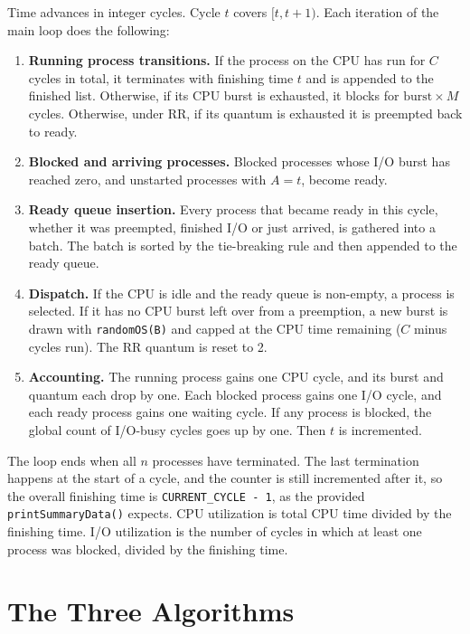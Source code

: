 \documentclass[11pt,letterpaper]{article}
\begin{document}
Time advances in integer cycles. Cycle \(t\) covers \([t, t+1)\). Each iteration of the main loop does the
following:
\begin{enumerate}
  \item \textbf{Running process transitions.} If the process on the CPU has run for \(C\) cycles in total, it
        terminates with finishing time \(t\) and is appended to the finished list. Otherwise, if its CPU burst is
        exhausted, it blocks for \(\text{burst}\times M\) cycles. Otherwise, under RR, if its quantum is exhausted
        it is preempted back to ready.
  \item \textbf{Blocked and arriving processes.} Blocked processes whose I/O burst has reached zero, and
        unstarted processes with \(A = t\), become ready.
  \item \textbf{Ready queue insertion.} Every process that became ready in this cycle, whether it was preempted,
        finished I/O or just arrived, is gathered into a batch. The batch is sorted by the tie-breaking rule and
        then appended to the ready queue.
  \item \textbf{Dispatch.} If the CPU is idle and the ready queue is non-empty, a process is selected. If it has no
        CPU burst left over from a preemption, a new burst is drawn with \texttt{randomOS(B)} and capped at the
        CPU time remaining (\(C\) minus cycles run). The RR quantum is reset to 2.
  \item \textbf{Accounting.} The running process gains one CPU cycle, and its burst and quantum each drop by
        one. Each blocked process gains one I/O cycle, and each ready process gains one waiting cycle. If any
        process is blocked, the global count of I/O-busy cycles goes up by one. Then \(t\) is incremented.
\end{enumerate}
The loop ends when all \(n\) processes have terminated. The last termination happens at the start of a cycle,
and the counter is still incremented after it, so the overall finishing time is \texttt{CURRENT\_CYCLE - 1}, as
the provided \texttt{printSummaryData()} expects. CPU utilization is total CPU time divided by the finishing
time. I/O utilization is the number of cycles in which at least one process was blocked, divided by the
finishing time.

\section{The Three Algorithms}
\end{document}
